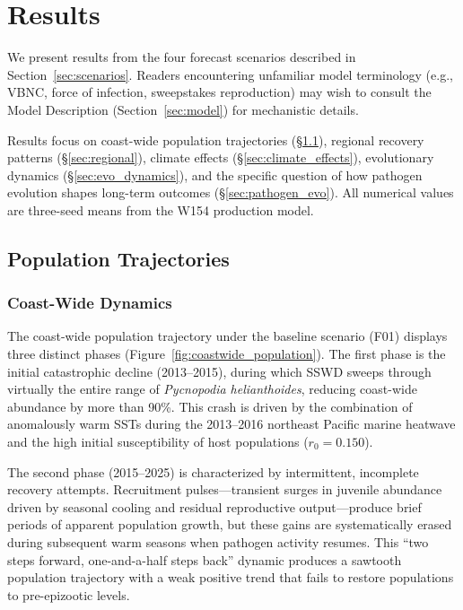 \section{Results}
\label{sec:results}

We present results from the four forecast scenarios described in
Section~\ref{sec:scenarios}.  Readers encountering unfamiliar model
terminology (e.g., VBNC, force of infection, sweepstakes reproduction)
may wish to consult the Model Description
(Section~\ref{sec:model}) for mechanistic details.

Results focus on coast-wide population
trajectories (\S\ref{sec:trajectories}), regional recovery patterns
(\S\ref{sec:regional}), climate effects (\S\ref{sec:climate_effects}),
evolutionary dynamics (\S\ref{sec:evo_dynamics}), and the specific
question of how pathogen evolution shapes long-term outcomes
(\S\ref{sec:pathogen_evo}).  All numerical values are three-seed means
from the W154 production model.

\subsection{Population Trajectories}
\label{sec:trajectories}

\subsubsection{Coast-Wide Dynamics}

The coast-wide population trajectory under the baseline scenario (F01)
displays three distinct phases (Figure~\ref{fig:coastwide_population}).
The first phase is the initial catastrophic decline (2013--2015), during
which SSWD sweeps through virtually the entire range of
\textit{Pycnopodia helianthoides}, reducing coast-wide abundance by
more than 90\%.  This crash is driven by the combination of anomalously
warm SSTs during the 2013--2016 northeast Pacific marine heatwave and
the high initial susceptibility of host populations ($r_0 = 0.150$).

The second phase (2015--2025) is characterized by intermittent,
incomplete recovery attempts.  Recruitment pulses---transient surges in
juvenile abundance driven by seasonal cooling and residual reproductive
output---produce brief periods of apparent population growth, but these
gains are systematically erased during subsequent warm seasons when
pathogen activity resumes.  This ``two steps forward, one-and-a-half
steps back'' dynamic produces a sawtooth population trajectory with a
weak positive trend that fails to restore populations to pre-epizootic
levels.

